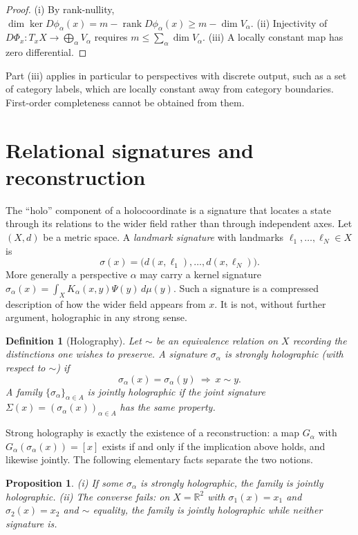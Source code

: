 \documentclass[11pt]{article}
\newtheorem{definition}{Definition}
\newtheorem{proposition}{Proposition}
\theoremstyle{remark}
\newcommand{\R}{\mathbb{R}}
\newcommand{\rank}{\operatorname{rank}}
\begin{document}
\begin{proof}
(i) By rank-nullity, $\dim\ker D\phi_\alpha(x)=m-\rank D\phi_\alpha(x)\ge m-\dim V_\alpha$. (ii) Injectivity of $D\Phi_x:T_xX\to\bigoplus_\alpha V_\alpha$ requires $m\le\sum_\alpha\dim V_\alpha$. (iii) A locally constant map has zero differential.
\end{proof}

Part (iii) applies in particular to perspectives with discrete output, such as a set of category labels, which are locally constant away from category boundaries. First-order completeness cannot be obtained from them.

\section{Relational signatures and reconstruction}

The ``holo'' component of a holocoordinate is a signature that locates a state through its relations to the wider field rather than through independent axes. Let $(X,d)$ be a metric space. A \emph{landmark signature} with landmarks $\ell_1,\dots,\ell_N\in X$ is
\[
\sigma(x)=\bigl(d(x,\ell_1),\dots,d(x,\ell_N)\bigr).
\]
More generally a perspective $\alpha$ may carry a kernel signature $\sigma_\alpha(x)=\int_XK_\alpha(x,y)\Psi(y)\,d\mu(y)$. Such a signature is a compressed description of how the wider field appears from $x$. It is not, without further argument, holographic in any strong sense.

\begin{definition}[Holography]
Let $\sim$ be an equivalence relation on $X$ recording the distinctions one wishes to preserve. A signature $\sigma_\alpha$ is \emph{strongly holographic} (with respect to $\sim$) if
\[
\sigma_\alpha(x)=\sigma_\alpha(y)\ \Longrightarrow\ x\sim y .
\]
A family $\{\sigma_\alpha\}_{\alpha\in A}$ is \emph{jointly holographic} if the joint signature $\Sigma(x)=(\sigma_\alpha(x))_{\alpha\in A}$ has the same property.
\end{definition}

Strong holography is exactly the existence of a reconstruction: a map $G_\alpha$ with $G_\alpha(\sigma_\alpha(x))=[x]$ exists if and only if the implication above holds, and likewise jointly. The following elementary facts separate the two notions.

\begin{proposition}
(i) If some $\sigma_\alpha$ is strongly holographic, the family is jointly holographic. (ii) The converse fails: on $X=\R^2$ with $\sigma_1(x)=x_1$ and $\sigma_2(x)=x_2$ and $\sim$ equality, the family is jointly holographic while neither signature is.
\end{proposition}
\end{document}
